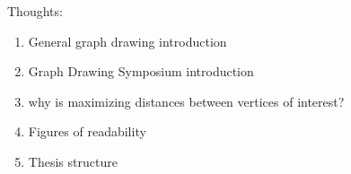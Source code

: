 Thoughts:
\begin{enumerate}
	\item General graph drawing introduction
	\item Graph Drawing Symposium introduction
	\item why is maximizing distances between vertices of interest?
	\item Figures of readability
	\item Thesis structure
\end{enumerate}